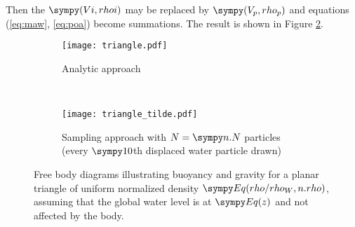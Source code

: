 Then the $\s{(Vi, rhoi)}$ may be replaced by $\s{(V_p, rho_p)}$ and equations (\ref{eq:maw}, \ref{eq:poa}) become summations.
The result is shown in Figure \ref{fg:fbdb}.  
\begin{figure}
\centering
\begin{subfigure}[t]{0.4\textwidth}
\texttt{[image: triangle.pdf]}
\caption{Analytic approach}
\label{fg:fbda}
\end{subfigure}
~
\begin{subfigure}[t]{0.4\textwidth}
\texttt{[image: triangle\_tilde.pdf]}
\caption{Sampling approach with $N = \s{n.N}$ particles (every $\s{10}$th displaced water particle drawn)}
\label{fg:fbdb}
\end{subfigure}
\caption{Free body diagrams illustrating buoyancy and gravity for a planar triangle of uniform normalized density $\s{Eq(rho/rho_W, n.rho)}$, assuming that the global water level is at $\s{Eq(z)}$ and not affected by the body.}
\label{fg:fbd}
\end{figure}

